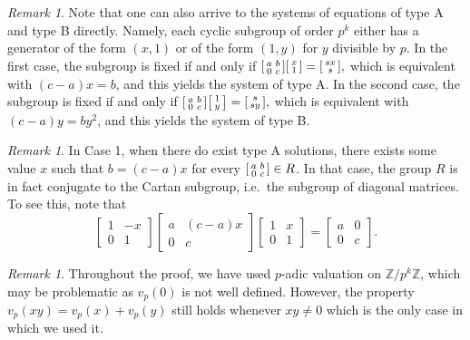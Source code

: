 \documentclass[10pt,leqno]{amsart}
\newcommand\m[1]{\begin{bmatrix}#1\end{bmatrix}}
\newcommand\sm[1]{\begin{bsmallmatrix}#1\end{bsmallmatrix}}
\newcommand{\Z}{\mathbb{Z}}
\theoremstyle{definition}
\theoremstyle{remark}
\newtheorem{remark}[theorem]{Remark}
\numberwithin{theorem}{section}
\begin{document}
\begin{remark}
    Note that one can also arrive to the systems of equations of type A and type B directly. Namely, each cyclic subgroup of order $p^k$ either has a generator of the form $(x, 1)$ or of the form $(1,y)$ for $y$ divisible by $p$. In the first case, the subgroup  is fixed if and only if $\sm{a & b \\ 0 & c}\sm{x \\1}=\sm{s x \\ s},$ which is equivalent with $(c-a)x=b$, and this yields the system of type A. In the second case, the subgroup is fixed if and only if   $\sm{a & b \\ 0 & c}\sm{1 \\y}=\sm{s  \\ s y},$ which is equivalent with $(c-a)y=by^2$, and this yields the system of type B. 
\end{remark}

\begin{remark}
    In Case 1, when there do exist type A solutions, there exists some value $x$ such that $b=(c-a)x$ for every $\sm{a & b \\ 0 & c} \in R$. In that case, the group $R$ is in fact conjugate to the Cartan subgroup, i.e.\ the subgroup of diagonal matrices. To see this, note that $$\m{1 & -x \\ 0 & 1}\m{a & (c-a)x \\ 0 & c }\m{1 & x \\ 0 & 1}=\m{a & 0 \\ 0 & c}.$$
\end{remark}

\begin{remark}
    Throughout the proof, we have used $p$-adic valuation on $\Z/p^k\Z$, which may be problematic as $v_p(0)$ is not well defined. However, the property $v_p(xy)=v_p(x)+v_p(y)$ still holds whenever $xy\neq 0$ which is the only case in which we used it.
\end{remark}
\end{document}
